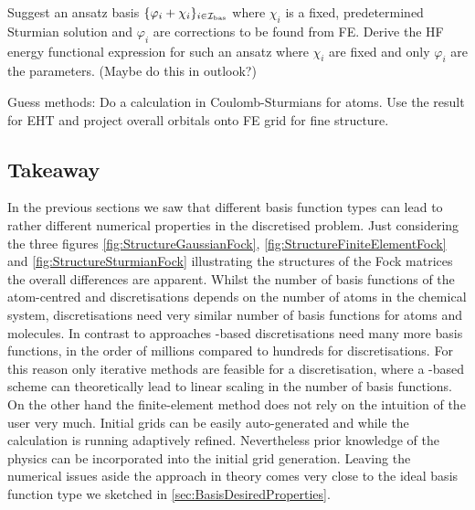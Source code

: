 Suggest an ansatz basis $\{\varphi_i + \chi_i\}_{i\in\mathcal{I}_\text{bas}}$
where $\chi_i$ is a fixed, predetermined Sturmian solution
and $\varphi_i$ are corrections to be found from FE.
Derive the HF energy functional expression for such an ansatz
where $\chi_i$ are fixed and only $\varphi_i$ are the parameters.
(Maybe do this in outlook?)




Guess methods:
Do a calculation in Coulomb-Sturmians for atoms.
Use the result for EHT and project overall orbitals onto FE grid
for fine structure.


\subsection{Takeaway}
In the previous sections we saw that different basis function types
can lead to rather different numerical properties in the discretised \HF problem.
Just considering the three figures
\vref{fig:StructureGaussianFock},
\vref{fig:StructureFiniteElementFock}
and \vref{fig:StructureSturmianFock}
illustrating the structures of the Fock matrices
the overall differences are apparent.
Whilst the number of basis functions of the atom-centred
\cGTO and \CS discretisations depends on the number of atoms
in the chemical system,
\FE discretisations need very similar number of basis functions
for atoms and molecules.
In contrast to \ACO approaches \FE-based discretisations
need many more basis functions, in the order of millions
compared to hundreds for \ACO discretisations.
For this reason only iterative methods
are feasible for a \FE discretisation,
where a \contract-based scheme can theoretically
lead to linear scaling in the number of basis functions.
On the other hand the finite-element method
does not rely on the intuition of the user very much.
Initial grids can be easily auto-generated and
while the calculation is running adaptively refined.
Nevertheless prior knowledge of the physics can be incorporated
into the initial grid generation.
Leaving the numerical issues aside
the \FE approach in theory comes very close to the ideal
basis function type we sketched in \vref{sec:BasisDesiredProperties}.

